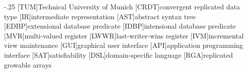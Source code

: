 \documentclass[headsepline,footsepline,footinclude=false,oneside,fontsize=11pt,paper=a4,listof=totoc,bibliography=totoc]{scrbook} %
\begin{document}


\frontmatter{}





\tableofcontents{}

\mainmatter{}








\appendix{}


\begin{acronym}
    \itemsep-.25\baselineskip
    [TUM]{Technical University of Munich}
    [CRDT]{convergent replicated data type}
    [IR]{intermediate representation}
    [AST]{abstract syntax tree}
    [EDBP]{extensional database predicate}
    [IDBP]{intensional database predicate}
    [MVR]{multi-valued register}
    [LWWR]{last-writer-wins register}
    [IVM]{incremental view maintenance}
    [GUI]{graphical user interface}
    [API]{application programming interface}
    [SAT]{satisfiability}
    [DSL]{domain-specific language}
    [RGA]{replicated growable arrays}
\end{acronym}

\listoffigures{}
\printbibliography{}
\end{document}
